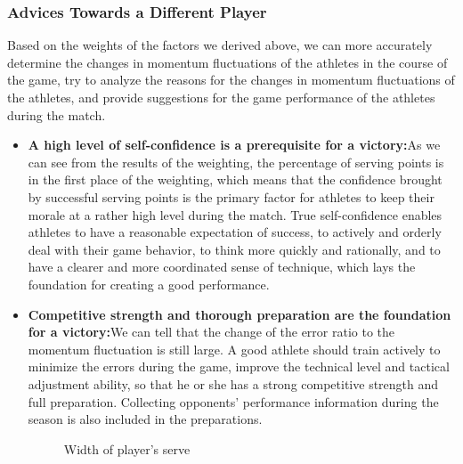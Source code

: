 \documentclass{mcmthesis}
\begin{document}
    \subsubsection{Advices Towards a Different Player}
    Based on the weights of the factors we derived above, we can more accurately determine the
    changes in momentum fluctuations of the athletes in the course of the game, try to analyze the
    reasons for the changes in momentum fluctuations of the athletes, and provide suggestions for the
    game performance of the athletes during the match.
    \begin{itemize}
        \item {\bf A high level of self-confidence is a prerequisite for a victory:}As we can see from the
        results of the weighting, the percentage of serving points is in the first place of the weighting, which means that the confidence brought by successful serving points is the primary factor for
        athletes to keep their morale at a rather high level during the match. True self-confidence enables
        athletes to have a reasonable expectation of success, to actively and orderly deal with their game
        behavior, to think more quickly and rationally, and to have a clearer and more coordinated sense of
        technique, which lays the foundation for creating a good performance.
        \item {\bf Competitive strength and thorough preparation are the foundation for a victory:}We
        can tell that the change of the error ratio to the momentum fluctuation is still large. A good athlete
        should train actively to minimize the errors during the game, improve the technical level and
        tactical adjustment ability, so that he or she has a strong competitive strength and full preparation. Collecting opponents’ performance information during the season is also included in the
        preparations.
    
        \begin{figure}[htbp]
            \centering
            \caption{Width of player's serve} \label{Figure 22-23}
        \end{figure}
    

\end{itemize}
\end{document}
